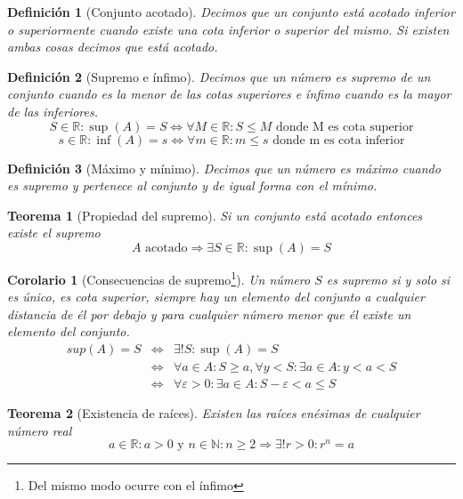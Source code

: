 \documentclass[10pt,a4paper,openright]{book}
\newtheorem{teorema}{Teorema}[chapter]
\newtheorem{corolario}{Corolario}[teorema]
\newtheorem{definicion}{Definición}[chapter]
\begin{document}
\begin{definicion}[Conjunto acotado]
Decimos que un conjunto está acotado inferior o superiormente cuando existe una cota inferior o superior del mismo. Si existen ambas cosas decimos que está acotado.
\end{definicion}

\begin{definicion}[Supremo e ínfimo]
Decimos que un número es supremo de un conjunto cuando es la menor de las cotas superiores e ínfimo cuando es la mayor de las inferiores.
$$S\in \mathbb R: \sup(A)=S \Leftrightarrow \forall M\in \mathbb R: S\leq M \mbox{ donde M es cota superior}$$
$$s\in \mathbb R: \inf(A)=s \Leftrightarrow \forall m\in \mathbb R: m\leq s \mbox{ donde m es cota inferior}$$
\end{definicion}

\begin{definicion}[Máximo y mínimo]
Decimos que un número es máximo cuando es supremo y pertenece al conjunto y de igual forma con el mínimo.
\end{definicion}

\begin{teorema}[Propiedad del supremo]
Si un conjunto está acotado entonces existe el supremo
$$A\mbox{ acotado}\Rightarrow \exists S\in \mathbb R: \sup(A)=S$$
\end{teorema}

\begin{corolario}[Consecuencias de supremo\footnote{Del mismo modo ocurre con el ínfimo}]
Un número $S$ es supremo si y solo si es único, es cota superior, siempre hay un elemento del conjunto a cualquier distancia de él por debajo y para cualquier número menor que él existe un elemento del conjunto.
\begin{eqnarray*}
sup(A)=S &\Leftrightarrow& \exists!S: \sup(A)=S \\
		 &\Leftrightarrow& \forall a\in A: S\geq a, \forall y<S: \exists a\in A: y<a<S \\
		 &\Leftrightarrow& \forall\varepsilon>0: \exists a\in A: S-\varepsilon<a\leq S
\end{eqnarray*}
\end{corolario}

\begin{teorema}[Existencia de raíces]
Existen las raíces enésimas de cualquier número real
$$a\in \mathbb R: a>0\mbox{ y }n\in \mathbb N: n\geq 2\Rightarrow \exists! r>0: r^n=a$$
\end{teorema}
\end{document}
